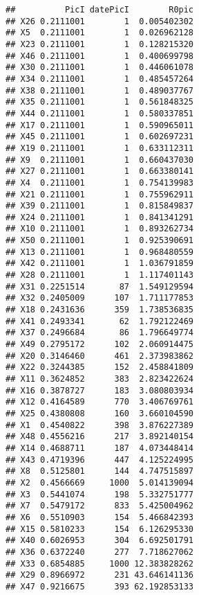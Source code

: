 \documentclass[
]{article}
\begin{document}
\begin{verbatim}
##          PicI datePicI        R0pic
## X26 0.2111001        1  0.005402302
## X5  0.2111001        1  0.026962128
## X23 0.2111001        1  0.128215320
## X46 0.2111001        1  0.400699798
## X30 0.2111001        1  0.446061078
## X34 0.2111001        1  0.485457264
## X38 0.2111001        1  0.489037767
## X35 0.2111001        1  0.561848325
## X44 0.2111001        1  0.580337851
## X17 0.2111001        1  0.590965011
## X45 0.2111001        1  0.602697231
## X19 0.2111001        1  0.633112311
## X9  0.2111001        1  0.660437030
## X27 0.2111001        1  0.663380141
## X4  0.2111001        1  0.754139983
## X21 0.2111001        1  0.755962911
## X39 0.2111001        1  0.815849837
## X24 0.2111001        1  0.841341291
## X10 0.2111001        1  0.893262734
## X50 0.2111001        1  0.925390691
## X13 0.2111001        1  0.968480559
## X42 0.2111001        1  1.036791859
## X28 0.2111001        1  1.117401143
## X31 0.2251514       87  1.549129594
## X32 0.2405009      107  1.711177853
## X18 0.2431636      359  1.738536835
## X41 0.2493341       62  1.792122469
## X37 0.2496684       86  1.796649774
## X49 0.2795172      102  2.060914475
## X20 0.3146460      461  2.373983862
## X22 0.3244385      152  2.458841809
## X11 0.3624852      383  2.823422624
## X16 0.3878727      183  3.080803934
## X12 0.4164589      770  3.406769761
## X25 0.4380808      160  3.660104590
## X1  0.4540822      398  3.876227389
## X48 0.4556216      217  3.892140154
## X14 0.4688711      187  4.073448414
## X43 0.4719396      447  4.125224995
## X8  0.5125801      144  4.747515897
## X2  0.4566669     1000  5.014139094
## X3  0.5441074      198  5.332751777
## X7  0.5479172      833  5.425004962
## X6  0.5510903      154  5.466842393
## X15 0.5810233      154  6.126295330
## X40 0.6026953      304  6.692501791
## X36 0.6372240      277  7.718627062
## X33 0.6854885     1000 12.383828262
## X29 0.8966972      231 43.646141136
## X47 0.9216675      393 62.192853133
\end{verbatim}
\end{document}
